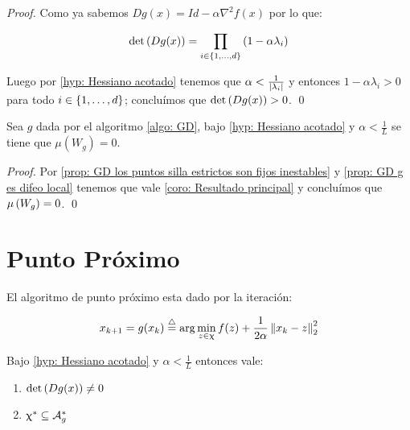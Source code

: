 \begin{proof}
	Como ya sabemos $Dg(x) = Id - \alpha \nabla^2 f (x)$ por lo que:
	
	\begin{equation*}
		\det \left(Dg(x)\right) = \prod\limits_{i \in \left\lbrace1, \dots, d\right\rbrace}{\left(1 - \alpha \lambda_i\right)}
	\end{equation*}
	
	Luego por \ref{hyp: Hessiano acotado} tenemos que $\alpha < \frac{1}{\left\lvert\lambda_i\right\rvert}$ y entonces $1 - \alpha \lambda_i > 0$ para todo $i \in \left\lbrace1, \dots, d\right\rbrace$; conclu\'imos que $\det \left(Dg(x)\right) > 0$. \qed
	
\end{proof}

\begin{corollary}
	\label{Dg converge a minimos}
	Sea $g$ dada por el algoritmo \ref{algo: GD}, bajo \ref{hyp: Hessiano acotado} y $\alpha < \frac{1}{L}$ se tiene que $\mu \left(W_g\right) = 0$.
\end{corollary}

\begin{proof}
	Por \ref{prop: GD los puntos silla estrictos son fijos inestables} y \ref{prop: GD g es difeo local} tenemos que vale \ref{coro: Resultado principal} y conclu\'imos que $\mu \left(W_g\right) = 0$. \qed
\end{proof}

\section{Punto Pr\'oximo}

El algoritmo de punto pr\'oximo esta dado por la iteraci\'on:

\begin{equation}
\label{eq: Punto proximo}
x_{k+1} = g(x_k) \stackrel{\triangle}{=} \arg \min\limits_{z \in \upchi}{f(z) + \dfrac{1}{2\alpha}\left\lVert x_k - z\right\rVert_{2}^{2}}
\end{equation}

\begin{proposition}
	\label{prop: PP es difeo local y los puntos silla estrictos son fijos inestables}
	Bajo \ref{hyp: Hessiano acotado} y $\alpha < \frac{1}{L}$ entonces vale:
	
	\begin{enumerate}
		\item $\det \left(Dg(x)\right) \neq 0$
		\item $\upchi^* \subseteq \mathcal{A}_{g}^{*}$
	\end{enumerate}
	
\end{proposition}

